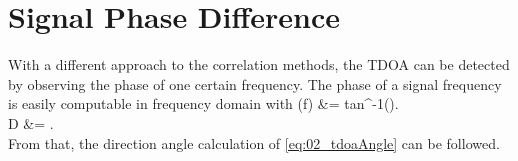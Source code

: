 \section{Signal Phase Difference}
\label{sec:02_phase}

With a different approach to the correlation methods, the \ac{TDOA} can be
detected by observing the phase of one certain frequency.
The phase of a signal frequency is easily computable in frequency domain
with
\bal
    \phi(f) &= tan^{-1}().\\
    D &= .\\
\eal
From that, the direction angle calculation of \cref{eq:02_tdoaAngle} can
be followed.